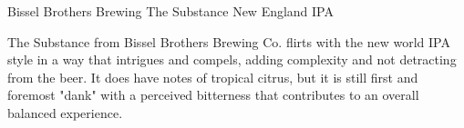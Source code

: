 \begin{recipie}{Bissel Brothers Brewing The Substance New England IPA}

\begin{aboutblock}
The Substance from Bissel Brothers Brewing Co. flirts with the new world IPA style
in a way that intrigues and compels, adding complexity and not detracting from the
beer. It does have notes of tropical citrus, but it is still first and foremost
"dank" with a perceived bitterness that contributes to an overall balanced experience.
\end{aboutblock}


\begin{methodandtiming}
 
\begin{mashsteps}
\end{mashsteps}

\begin{fermentationsteps}
\end{fermentationsteps}

\end{methodandtiming}

\pagebreak

\begin{ingredientsblock}

\begin{malts}
\end{malts}

\begin{hops}

\end{hops}

\begin{yeasts}
\end{yeasts}

\end{ingredientsblock}

\end{recipie}

